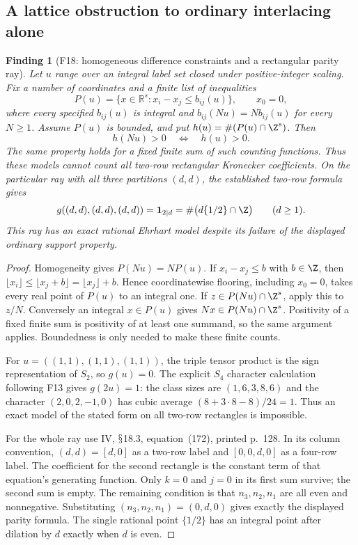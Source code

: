 \documentclass[11pt,a4paper]{article}
\renewcommand{\S}{\ensuremath{\mathsection}}
\newcommand{\fid}[1]{\textsf{#1}}\newcommand{\gate}[1]{\textsf{#1}}
\theoremstyle{named}\newtheorem{finding}{Finding}[section]
\theoremstyle{definition}\newtheorem{definition}[finding]{Definition}
\theoremstyle{remark}\newtheorem{remark}[finding]{Remark}
\begin{document}
\subsection{A lattice obstruction to ordinary interlacing alone}
\begin{finding}[\fid{F18}: homogeneous difference constraints and a rectangular parity ray]\label{f:saturation}
Let $u$ range over an integral label set closed under positive-integer scaling. Fix a number of coordinates and a finite list of inequalities
\[
 P(u)=\{x\in\mathbb R^s:x_i-x_j\le b_{ij}(u)\},\qquad x_0=0,
\]
where every specified $b_{ij}(u)$ is integral and $b_{ij}(Nu)=Nb_{ij}(u)$ for every $N\ge1$. Assume $P(u)$ is bounded, and put $h(u)=\#(P(u)\cap\Z^s)$. Then
\[
 h(Nu)>0\quad\Longleftrightarrow\quad h(u)>0.
\]
The same property holds for a fixed finite sum of such counting functions. Thus these models cannot count all two-row rectangular Kronecker coefficients. On the particular ray with all three partitions $(d,d)$, the established two-row formula gives
\[
 g((d,d),(d,d),(d,d))=\boldsymbol1_{2\mid d}
 =\#\bigl(d\{1/2\}\cap\Z\bigr)\qquad(d\ge1).
\]
This ray has an exact rational Ehrhart model despite its failure of the displayed ordinary support property.
\end{finding}
\begin{proof}
Homogeneity gives $P(Nu)=NP(u)$. If $x_i-x_j\le b$ with $b\in\Z$, then
$\lfloor x_i\rfloor\le\lfloor x_j+b\rfloor=\lfloor x_j\rfloor+b$.
Hence coordinatewise flooring, including $x_0=0$, takes every real point of $P(u)$ to an integral one. If $z\in P(Nu)\cap\Z^s$, apply this to $z/N$. Conversely an integral $x\in P(u)$ gives $Nx\in P(Nu)\cap\Z^s$. Positivity of a fixed finite sum is positivity of at least one summand, so the same argument applies. Boundedness is only needed to make these finite counts.

For $u=((1,1),(1,1),(1,1))$, the triple tensor product is the sign representation of $S_2$, so $g(u)=0$. The explicit $S_4$ character calculation following \fid{F13} gives $g(2u)=1$: the class sizes are $(1,6,3,8,6)$ and the character $(2,0,2,-1,0)$ has cubic average $(8+3\cdot8-8)/24=1$. Thus an exact model of the stated form on all two-row rectangles is impossible.

For the whole ray use IV, \S18.3, equation~(172), printed p.~128. In its column convention, $(d,d)=[d,0]$ as a two-row label and $[0,0,d,0]$ as a four-row label. The coefficient for the second rectangle is the constant term of that equation's generating function. Only $k=0$ and $j=0$ in its first sum survive; the second sum is empty. The remaining condition is that $n_3,n_2,n_1$ are all even and nonnegative. Substituting $(n_3,n_2,n_1)=(0,d,0)$ gives exactly the displayed parity formula. The single rational point $\{1/2\}$ has an integral point after dilation by $d$ exactly when $d$ is even.
\end{proof}
\end{document}
